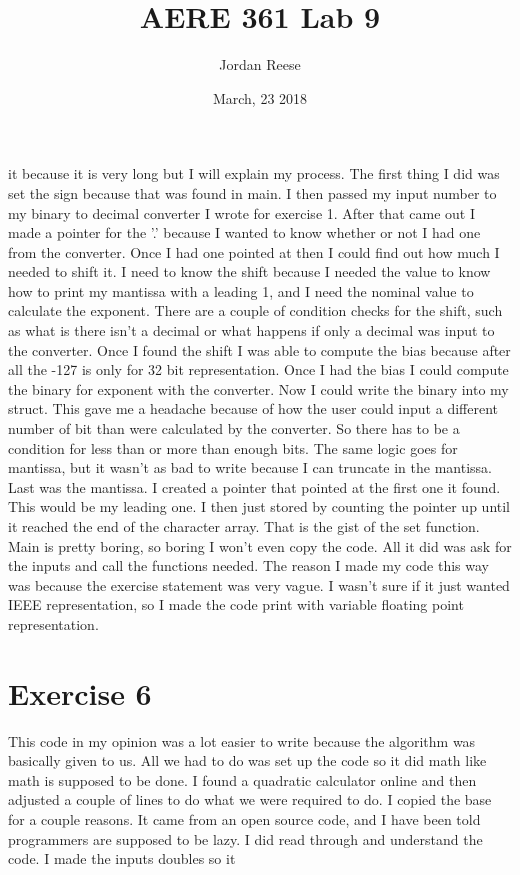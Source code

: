 \documentclass{article} \usepackage[utf8]{inputenc} \title{AERE 361 Lab 9} \author{Jordan Reese} \date{March, 23 2018} \usepackage{listings} \usepackage{color}
\begin{document}
it because it is very long but I will explain my process. The first thing I did was set the sign because that was found in main. I then passed my input number 
to my binary to decimal converter I wrote for exercise 1. After that came out I made a pointer for the '.' because I wanted to know whether or not I had one 
from the converter. Once I had one pointed at then I could find out how much I needed to shift it. I need to know the shift because I needed the value to know 
how to print my mantissa with a leading 1, and I need the nominal value to calculate the exponent. There are a couple of condition checks for the shift, such as 
what is there isn't a decimal or what happens if only a decimal was input to the converter. Once I found the shift I was able to compute the bias because after 
all the -127 is only for 32 bit representation. Once I had the bias I could compute the binary for exponent with the converter. Now I could write the binary 
into my struct. This gave me a headache because of how the user could input a different number of bit than were calculated by the converter. So there has to be 
a condition for less than or more than enough bits. The same logic goes for mantissa, but it wasn't as bad to write because I can truncate in the mantissa. Last 
was the mantissa. I created a pointer that pointed at the first one it found. This would be my leading one. I then just stored by counting the pointer up until 
it reached the end of the character array. That is the gist of the set function. \newline \newline Main is pretty boring, so boring I won't even copy the code. 
All it did was ask for the inputs and call the functions needed. The reason I made my code this way was because the exercise statement was very vague. I wasn't 
sure if it just wanted IEEE representation, so I made the code print with variable floating point representation. \section{Exercise 6} This code in my opinion 
was a lot easier to write because the algorithm was basically given to us. All we had to do was set up the code so it did math like math is supposed to be done. 
I found a quadratic calculator online and then adjusted a couple of lines to do what we were required to do. I copied the base for a couple reasons. It came 
from an open source code, and I have been told programmers are supposed to be lazy. I did read through and understand the code. I made the inputs doubles so it 
\end{document}
